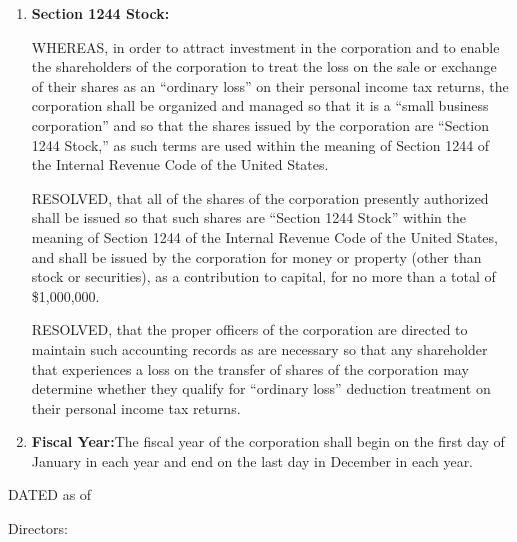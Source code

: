 \begin{enumerate}[leftmargin=*, label=\arabic*.]
	\item \textbf{Section 1244 Stock:}

	\par\medskip\noindent
	WHEREAS, in order to attract investment in the corporation and to enable the shareholders of the
	corporation to treat the loss on the sale or exchange of their shares as an ``ordinary loss'' on
	their personal income tax returns, the corporation shall be organized and managed so that it is a
	``small business corporation'' and so that the shares issued by the corporation are ``Section 1244
	Stock,'' as such terms are used within the meaning of Section 1244 of the Internal Revenue Code of
	the United States.

	\par\medskip\noindent
	RESOLVED, that all of the shares of the corporation presently authorized shall be issued so that
	such shares are ``Section 1244 Stock'' within the meaning of Section 1244 of the Internal Revenue
	Code of the United States, and shall be issued by the corporation for money or property (other than
	stock or securities), as a contribution to capital, for no more than a total of \$1,000,000.

	\par\medskip\noindent
	RESOLVED, that the proper officers of the corporation are directed to maintain such accounting
	records as are necessary so that any shareholder that experiences a loss on the transfer of shares
	of the corporation may determine whether they qualify for ``ordinary loss'' deduction treatment on
	their personal income tax returns.

	\setcounter{enumi}{7}
	\item \textbf{Fiscal Year:}\enspace The fiscal year of the corporation shall begin on the first
	day of January in each year and end on the last day in December in each year.
\end{enumerate}

\bigskip
\noindent DATED as of \datedText

\bigskip
\noindent Directors:

\sigpair{\directorOne}{\directorTwo}
\sigpair{\directorThree}{\directorFour}
\sigpair{\directorFive}{\directorSix}
